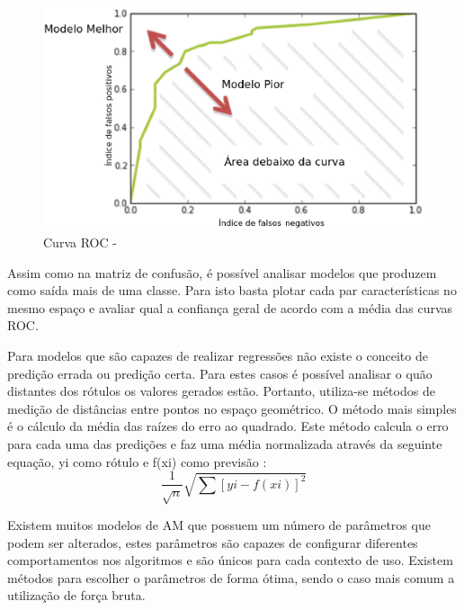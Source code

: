 \begin{figure}[!h]
\centering
\includegraphics[keepaspectratio=true,scale=0.70]
{figuras/roc.eps}
\caption{Curva ROC - \cite{howard2012b}}
\label{over}
\end{figure}


Assim como na matriz de confusão, é possível analisar modelos que produzem como saída mais de uma classe. Para isto basta plotar cada par características no mesmo espaço e avaliar qual a confiança geral de acordo com a média das curvas ROC.

Para modelos que são capazes de realizar regressões não existe o conceito de predição errada ou predição certa. Para estes casos é possível analisar o quão distantes dos rótulos os valores gerados estão. Portanto, utiliza-se métodos de medição de distâncias entre pontos no espaço geométrico. O método mais simples é o cálculo da média das raízes do erro ao quadrado. Este método calcula o erro para cada uma das predições e faz uma média normalizada através da seguinte equação, yi como rótulo e f(xi) como previsão \cite{real2013}: 
 \[
       \frac{1}{\sqrt{n}}\sqrt{\sum \left [ y{i} - f\left ( x{i} \right )\right ]^{2} }
  \] 
  
Existem muitos modelos de AM que possuem um número de parâmetros que podem ser alterados, estes parâmetros são capazes de configurar diferentes comportamentos nos algoritmos e são únicos para cada contexto de uso. Existem métodos para escolher o parâmetros de forma ótima, sendo o caso mais comum a utilização de força bruta. 









































